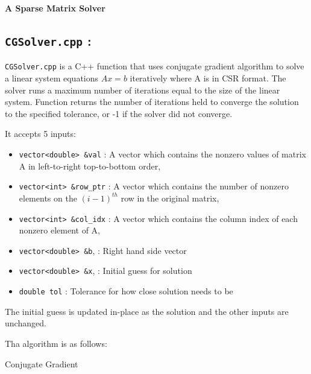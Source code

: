 \documentclass[10pt]{article}
\begin{document}
\begin{center}
    \large \textbf{A Sparse Matrix Solver}
\end{center}

\subsection*{\texttt{CGSolver.cpp} :}

\texttt{CGSolver.cpp} is a C++ function that uses conjugate gradient algorithm to solve a linear system equations $Ax=b$ iteratively where A is in CSR format. The solver runs a maximum number of iterations equal to the size of the linear system.  Function returns the number of iterations held to converge the solution to the specified tolerance, or -1 if the solver did not converge.

It accepts 5 inputs:
\begin{itemize}
    \item \texttt{vector<double> \&val} : A vector which contains the nonzero values of matrix A in left-to-right top-to-bottom order,
    \item \texttt{vector<int> \&row\_ptr} : A vector which contains the number of nonzero elements on the $(i-1)^{th}$ row in the original matrix,
    \item \texttt{vector<int> \&col\_idx} : A vector which contains the column index of each nonzero element of A,
    \item \texttt{vector<double> \&b}, : Right hand side vector
    \item \texttt{vector<double> \&x}, : Initial guess for solution
    \item \texttt{double tol} : Tolerance for how close solution needs to be
\end{itemize}

The initial guess is updated in-place as the solution and the other inputs are unchanged.

Tha algorithm is as follows:

\begin{algorithm}
\DontPrintSemicolon
{} 
\caption{Conjugate Gradient}
\end{algorithm}
\clearpage
\end{document}
